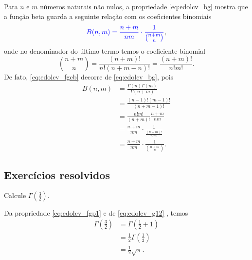 Para $n$ e $m$ números naturais não nulos, a propriedade \eqref{eq:edolcv_bg} mostra que a função beta guarda a seguinte relação com os coeficientes binomiais
\begin{equation}\label{eq:edolcv_fgcb}
  {\color{blue}B(n,m) = \frac{n+m}{nm}\cdot \frac{1}{\binom{n+m}{n}}},
\end{equation}
onde no denominador do último termo temos o coeficiente binomial
\begin{equation}
  \binom{n+m}{n} = \frac{(n+m)!}{n!(n+m-n)!} = \frac{(n+m)!}{n!m!}.
\end{equation}
De fato, \eqref{eq:edolcv_fgcb} decorre de \eqref{eq:edolcv_bg}, pois
\begin{align}
  B(n,m) &= \frac{\Gamma(n)\Gamma(m)}{\Gamma(n+m)} \\
         &= \frac{(n-1)!(m-1)!}{(n+m-1)!}\\
         &= \frac{n!m!}{(n+m)!}\frac{n+m}{nm}\\
         &= \frac{n+m}{nm}\cdot\frac{1}{\frac{(n+m)!}{n!m!}}\\
         &= \frac{n+m}{nm}\cdot \frac{1}{\binom{n+m}{n}}.
\end{align}

\subsection*{Exercícios resolvidos}

\begin{exeresol}
  Calcule $\displaystyle\Gamma\left(\frac{3}{2}\right)$.
\end{exeresol}
\begin{resol}
  Da propriedade \eqref{eq:edolcv_fgp1} e de \eqref{eq:edolcv_g12} , temos
  \begin{align}
    \Gamma\left(\frac{3}{2}\right) &= \Gamma\left(\frac{1}{2}+1\right)\\
                                   &= \frac{1}{2}\Gamma\left(\frac{1}{2}\right)\\
                                   &= \frac{1}{2}\sqrt{\pi}.
  \end{align}
\end{resol}

